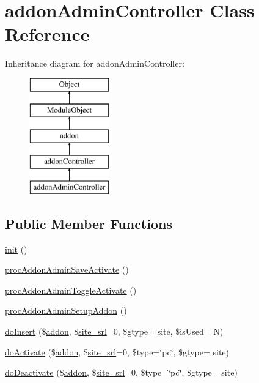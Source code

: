 \hypertarget{classaddonAdminController}{}\section{addon\+Admin\+Controller Class Reference}
\label{classaddonAdminController}
Inheritance diagram for addon\+Admin\+Controller\+:\begin{figure}[H]
\begin{center}
\leavevmode
\includegraphics[height=5.000000cm]{classaddonAdminController}
\end{center}
\end{figure}
\subsection*{Public Member Functions}
\begin{DoxyCompactItemize}
\item 
\hyperlink{classaddonAdminController_a429384cd42bbb45d8a9f6be4073cc7b6}{init} ()
\item 
\hyperlink{classaddonAdminController_a59081b3459b0704e973fdbe2fc5d14d1}{proc\+Addon\+Admin\+Save\+Activate} ()
\item 
\hyperlink{classaddonAdminController_a97250cb7cb4dc0b78789b8a9186d94d4}{proc\+Addon\+Admin\+Toggle\+Activate} ()
\item 
\hyperlink{classaddonAdminController_a43db10c21a41c0ebbeb13257d9bf86ea}{proc\+Addon\+Admin\+Setup\+Addon} ()
\item 
\hyperlink{classaddonAdminController_a26ac8a98f91ad7a48d9307b7a87932c7}{do\+Insert} (\$\hyperlink{classaddon}{addon}, \$\hyperlink{ko_8install_8php_a8b1406b4ad1048041558dce6bfe89004}{site\+\_\+srl}=0, \$gtype= \textquotesingle{}site\textquotesingle{}, \$is\+Used= \textquotesingle{}N\textquotesingle{})
\item 
\hyperlink{classaddonAdminController_a226fc2d221e8f5272dabeb1ef86cb9f3}{do\+Activate} (\$\hyperlink{classaddon}{addon}, \$\hyperlink{ko_8install_8php_a8b1406b4ad1048041558dce6bfe89004}{site\+\_\+srl}=0, \$type=\char`\"{}pc\char`\"{}, \$gtype= \textquotesingle{}site\textquotesingle{})
\item 
\hyperlink{classaddonAdminController_ae520cdfe4f5e3f2e7c24c34d5a8d316e}{do\+Deactivate} (\$\hyperlink{classaddon}{addon}, \$\hyperlink{ko_8install_8php_a8b1406b4ad1048041558dce6bfe89004}{site\+\_\+srl}=0, \$type=\char`\"{}pc\char`\"{}, \$gtype= \textquotesingle{}site\textquotesingle{})
\end{DoxyCompactItemize}
